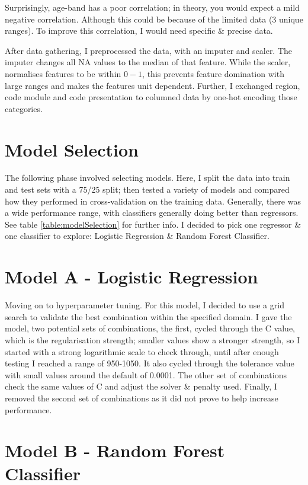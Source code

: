 \documentclass[11pt, a4paper]{article}
\begin{document}
\begin{multicols}{2}
Surprisingly, age-band has a poor correlation; in theory, you would expect a mild negative correlation. Although this could be because of the limited data (3 unique ranges). To improve this correlation, I would need specific \& precise data.

After data gathering, I preprocessed the data, with an imputer and scaler. The imputer changes all NA values to the median of that feature. 
While the scaler, normalises features to be within $0-1$, this prevents feature domination with large ranges and makes the features unit dependent.
Further, I exchanged region, code module and code presentation to columned data by one-hot encoding those categories.

\section{Model Selection}

The following phase involved selecting models. Here, I split the data into train and test sets with a 75/25 split; then tested a variety of models and compared how they performed in cross-validation on the training data. 
Generally, there was a wide performance range, with classifiers generally doing better than regressors. See table \ref{table:modelSelection} for further info. I decided to pick one regressor \& one classifier to explore: Logistic Regression \& Random Forest Classifier.

\section{Model A - Logistic Regression}

Moving on to hyperparameter tuning. For this model, I decided to use a grid search to validate the best combination within the specified domain. 
I gave the model, two potential sets of combinations, the first, cycled through the C value, which is the regularisation strength; smaller values show a stronger strength, 
so I started with a strong logarithmic scale to check through, until after enough testing I reached a range of 950-1050. It also cycled through the tolerance value with small values around the default of 0.0001.
The other set of combinations check the same values of C and adjust the solver \& penalty used. Finally, I removed the second set of combinations as it did not prove to help increase performance.

\section{Model B - Random Forest Classifier}


\end{multicols}
\end{document}
